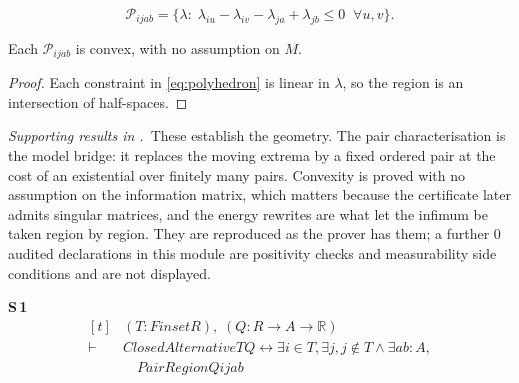 \begin{definition}
\begin{equation}
\mathcal{P}_{ijab}=\bigl\{\lambda:\;
\lambda_{iu}-\lambda_{iv}-\lambda_{ja}+\lambda_{jb}\leq 0
\;\;\forall u,v\bigr\}.
\label{eq:polyhedron}
\end{equation}
\end{definition}

\begin{proposition}
\label{prop:convex}
Each $\mathcal{P}_{ijab}$ is convex, with no assumption on $M$.
\end{proposition}

\begin{proof}
Each constraint in \eqref{eq:polyhedron} is linear in $\lambda$, so the region is an
intersection of half-spaces.
\end{proof}


\noindent\emph{Supporting results in .}~These establish the geometry. The pair characterisation is the model bridge: it replaces the moving extrema by a fixed ordered pair at the cost of an existential over finitely many pairs. Convexity is proved with no assumption on the information matrix, which matters because the certificate later admits singular matrices, and the energy rewrites are what let the infimum be taken region by region. They are reproduced as the prover has them; a further $0$ audited declarations in this module are positivity checks and measurability side conditions and are not displayed.

\noindent\textbf{S\,1}\quad{}
{\footnotesize\[ \begin{aligned}[t]
&(\mathit{T} : \mathit{Finset} \mathit{R}),\; (\mathit{Q} : \mathit{R} \to \mathit{A} \to \mathbb{R} )\\
\vdash\;&\mathit{ClosedAlternative} \mathit{T} \mathit{Q} \leftrightarrow \exists \mathit{i} \in \mathit{T}, \exists \mathit{j}, \mathit{j} \notin \mathit{T} \wedge \exists \mathit{a} \mathit{b} : \mathit{A},\\
&\quad \mathit{PairRegion} \mathit{Q} \mathit{i} \mathit{j} \mathit{a} \mathit{b}
\end{aligned} \]}

